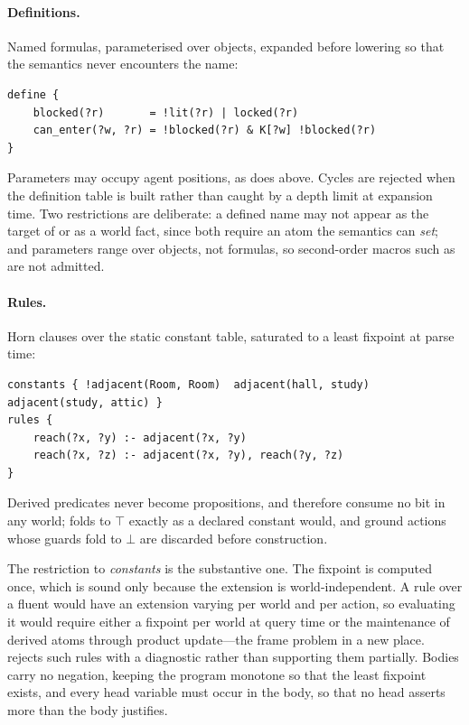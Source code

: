 \documentclass[11pt,a4paper]{article}
\begin{document}
\paragraph{Definitions.}
Named formulas, parameterised over objects, expanded before lowering so that the semantics
never encounters the name:
\begin{lstlisting}
define {
    blocked(?r)       = !lit(?r) | locked(?r)
    can_enter(?w, ?r) = !blocked(?r) & K[?w] !blocked(?r)
}
\end{lstlisting}
Parameters may occupy agent positions, as  does above. Cycles are rejected when the
definition table is built rather than caught by a depth limit at expansion time. Two
restrictions are deliberate: a defined name may not appear as the target of  or
as a world fact, since both require an atom the semantics can \emph{set}; and parameters range
over objects, not formulas, so second-order macros such as  are
not admitted.

\paragraph{Rules.}
Horn clauses over the static constant table, saturated to a least fixpoint at parse time:
\begin{lstlisting}
constants { !adjacent(Room, Room)  adjacent(hall, study)  adjacent(study, attic) }
rules {
    reach(?x, ?y) :- adjacent(?x, ?y)
    reach(?x, ?z) :- adjacent(?x, ?y), reach(?y, ?z)
}
\end{lstlisting}
Derived predicates never become propositions, and therefore consume no bit in any world;
 folds to $\top$ exactly as a declared constant would, and ground
actions whose guards fold to $\bot$ are discarded before construction.

The restriction to \emph{constants} is the substantive one. The fixpoint is computed once,
which is sound only because the extension is world-independent. A rule over a fluent would
have an extension varying per world and per action, so evaluating it would require either a
fixpoint per world at query time or the maintenance of derived atoms through product
update---the frame problem in a new place. \delhi{} rejects such rules with a diagnostic
rather than supporting them partially. Bodies carry no negation, keeping the program monotone
so that the least fixpoint exists, and every head variable must occur in the body, so that no
head asserts more than the body justifies.
\end{document}
